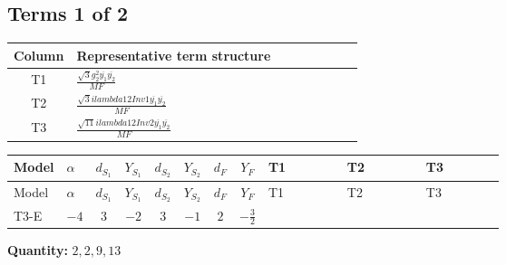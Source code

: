 \documentclass[8pt]{article}
\begin{document}
\begin{landscape}
\subsection*{Terms 1 of 2}
\begin{center}
\begin{tabular}{@{}c >{\raggedright\arraybackslash}p{0.82\linewidth}@{}}
\toprule
Column & Representative term structure \\
\midrule
T1 & \(\displaystyle \frac{\sqrt{3} g_{2}^{2} \overline{y_{1}} \overline{y_{2}}}{MF}\) \\
\midrule
T2 & \(\displaystyle \frac{\sqrt{3} i lambda12Inv1 \overline{y_{1}} \overline{y_{2}}}{MF}\) \\
\midrule
T3 & \(\displaystyle \frac{\sqrt{11} i lambda12Inv2 \overline{y_{1}} \overline{y_{2}}}{MF}\) \\
\midrule
\bottomrule
\end{tabular}
\end{center}
\smallskip
\tiny
\begin{longtable}{@{}llcccccc >{\raggedright\arraybackslash}p{0.21\linewidth} >{\raggedright\arraybackslash}p{0.21\linewidth} >{\raggedright\arraybackslash}p{0.21\linewidth}@{}}
\toprule
Model & $\alpha$ & $d_{S_1}$ & $Y_{S_1}$ & $d_{S_2}$ & $Y_{S_2}$ & $d_F$ & $Y_F$ & T1 & T2 & T3 \\
\midrule
\endfirsthead
\toprule
Model & $\alpha$ & $d_{S_1}$ & $Y_{S_1}$ & $d_{S_2}$ & $Y_{S_2}$ & $d_F$ & $Y_F$ & T1 & T2 & T3 \\
\midrule
\endhead
T3-E & $-4$ & $3$ & $-2$ & $3$ & $-1$ & $2$ & $-\frac{3}{2}$ & \scriptsize\adjustbox{max width=\linewidth}{$\begin{gathered} - \frac{\sqrt{3} g_{2}^{2} \overline{y_{1}} \overline{y_{2}}}{6 MF}\end{gathered}$} & \scriptsize\adjustbox{max width=\linewidth}{$\begin{gathered} - \frac{\sqrt{3} i lambda12Inv1 \overline{y_{1}} \overline{y_{2}}}{6 MF}\end{gathered}$} & \scriptsize\adjustbox{max width=\linewidth}{$\begin{gathered} \frac{3 \sqrt{11} i lambda12Inv2 \overline{y_{1}} \overline{y_{2}}}{22 MF}\end{gathered}$} \\
\midrule
\bottomrule
\end{longtable}
\clearpage
\noindent\textbf{Quantity: }$\mathrm{2,2,9,13}$\par\smallskip

\end{landscape}
\end{document}
